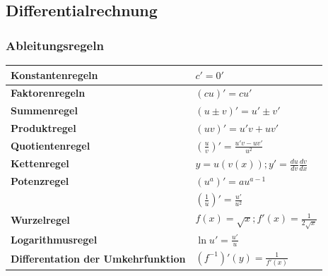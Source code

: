 \subsection{Differentialrechnung}
\subsubsection{Ableitungsregeln }
{\small
\renewcommand{\arraystretch}{1.5}
\begin{tabular}{|l|l|}
	\hline \textbf{Konstantenregeln}& $c'=0'$\\
	\hline \textbf{Faktorenregeln}& $(cu)'=c u'$\\
	\hline \textbf{Summenregel}& $(u\pm v)'= u' \pm v'$\\
	\hline \textbf{Produktregel}& $(uv)'=u'v + uv'$\\
	\hline \textbf{Quotientenregel}& $(\frac{u}{v})'= \frac{u'v-uv'}{u^{2}}$\\
	\hline \textbf{Kettenregel}& $y=u(v(x)) ; y'=\frac{du}{dv} \frac{dv}{dx}$\\
	\hline \textbf{Potenzregel} & $(u^{a})'=au^{a-1}$\\
	& $(\frac{1}{u})'= \frac{u'}{u^2}$\\
	\hline	\textbf{Wurzelregel} & $f(x)=\sqrt{x} ; f'(x)=\frac{1}{2\sqrt{x}}$\\
	\hline	\textbf{Logarithmusregel} & $\ln{u}'=\frac{u'}{u}$\\ 
	\hline	\textbf{Differentation der Umkehrfunktion} & $(f^{-1})'(y)=\frac{1}{f'(x)} $\\
	\hline 
\end{tabular}
}
